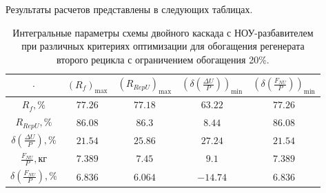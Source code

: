 Результаты расчетов представлены в следующих таблицах.



\begin{table}
    \begin{tabular}{ccccc}
        $\cdot$ & $(R_f)_\text{max}$ & $(R_{RepU})_\text{max}$ & $(\delta(\frac{\Delta U}{P}))_\text{min}$ & $(\delta(\frac{F_{NU}}{P}))_\text{min}$\\ \hline
        $R_f, \%$ & $77.26$ & $77.18$ & $63.22$ & $77.26$\\ \hline
        $R_{RepU}, \%$ & $86.08$ & $86.3$ & $8.44$ & $86.08$\\ \hline
        $\delta(\frac{\Delta U}{P}), \%$ & $21.54$ & $25.86$ & $27.24$ & $21.54$\\ \hline
        $\frac{F_{NU}}{P}, \text{кг}$ & $7.389$ & $7.45$ & $9.1$ & $7.389$\\ \hline
        $\delta(\frac{F_{NU}}{P}), \%$ & $6.836$ & $6.064$ & $-14.74$ & $6.836$\\ \hline
    \end{tabular}
    \caption{Интегральные параметры схемы двойного каскада с НОУ-разбавителем при различных критериях оптимизации для обогащения регенерата второго рецикла с ограничением обогащения 20\%.{\label{2opt2_20_int}}}
\end{table}


